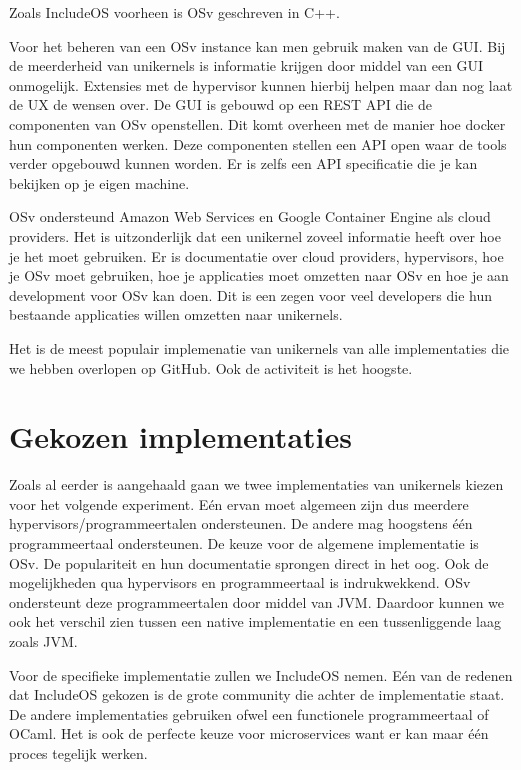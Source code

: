 \documentclass[pdftex,a4paper,12pt,twoside]{report}
\begin{document}
Zoals IncludeOS voorheen is OSv geschreven in C++. 

Voor het beheren van een OSv instance kan men gebruik maken van de GUI. Bij de meerderheid van unikernels is informatie krijgen door middel van een GUI onmogelijk. Extensies met de hypervisor kunnen hierbij helpen maar dan nog laat de UX de wensen over. De GUI is gebouwd op een REST API die de componenten van OSv openstellen. Dit komt overheen met de manier hoe docker hun componenten werken. Deze componenten stellen een API open waar de tools verder opgebouwd kunnen worden. Er is zelfs een API specificatie die je kan bekijken op je eigen machine.

OSv ondersteund Amazon Web Services en Google Container Engine als cloud providers. Het is uitzonderlijk dat een unikernel zoveel informatie heeft over hoe je het moet gebruiken. Er is documentatie over cloud providers, hypervisors, hoe je OSv moet gebruiken, hoe je applicaties moet omzetten naar OSv en hoe je aan development voor OSv kan doen. 
Dit is een zegen voor veel developers die hun bestaande applicaties willen omzetten naar unikernels.

Het is de meest populair implemenatie van unikernels van alle implementaties die we hebben overlopen op GitHub. Ook de activiteit is het hoogste.

\section{Gekozen implementaties}

Zoals al eerder is aangehaald gaan we twee implementaties van unikernels kiezen voor het volgende experiment. Eén ervan moet algemeen zijn dus meerdere hypervisors/programmeertalen ondersteunen.
De andere mag hoogstens één programmeertaal ondersteunen.
De keuze voor de algemene implementatie is OSv. De populariteit en hun documentatie sprongen direct in het oog. Ook de mogelijkheden qua hypervisors en programmeertaal is indrukwekkend.
OSv ondersteunt deze programmeertalen door middel van JVM. Daardoor kunnen we ook het verschil zien tussen een native implementatie en een tussenliggende laag zoals JVM.

Voor de specifieke implementatie zullen we IncludeOS nemen. Eén van de redenen dat IncludeOS gekozen is de grote community die achter de implementatie staat. De andere implementaties gebruiken ofwel een functionele programmeertaal of OCaml.
Het is ook de perfecte keuze voor microservices want er kan maar één proces tegelijk werken.
\end{document}
